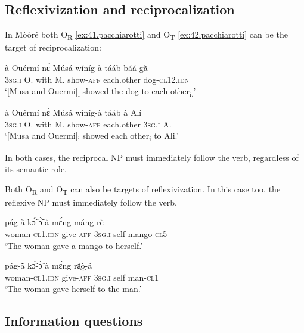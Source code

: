 \documentclass[output=paper]{langsci/langscibook}
\begin{document}
\subsection{Reflexivization and reciprocalization}\label{§5.4:reflexivization.pacchiarotti}

In Mòòré both O\textsubscript{R} \ref{ex:41.pacchiarotti} and O\textsubscript{T} \ref{ex:42.pacchiarotti} can be the target of reciprocalization:

\ea
\label{ex:41.pacchiarotti}
\gll \`{a}    Ouérm\'{i}  nɛ́  M\'{u}s\'{a}  w\'{i}n\'{i}g-\`{a}  t\'{a}\'{a}b    b\'{a}\'{a}-g\`{\~{a}} \\
\textsc{3sg.i  }  O.    with  M.  show-\textsc{aff}  each.other  dog-\textsc{cl12.idn}\\
\glt `[Musa and Ouermi]\textsubscript{i} showed the dog to each other\textsubscript{i.}'
\z

\ea
\label{ex:42.pacchiarotti}
\gll \`{a}    Ouérm\'{i}  nɛ́  M\'{u}s\'{a}  w\'{i}n\'{i}g-\`{a}  t\'{a}\'{a}b    \`{a}    Al\'{i}\\
\textsc{3sg.i    }O.    with  M.  show-\textsc{aff}  each.other  \textsc{3sg.i  }   A.\\
\glt `[Musa and Ouermi]\textsubscript{i} showed each other\textsubscript{i} to Ali.'
\z

In both cases, the reciprocal NP must immediately follow the verb, regardless of its semantic role. 

Both O\textsubscript{R }and O\textsubscript{T} can also be targets of reflexivization. In this case too, the reflexive NP must immediately follow the verb.

\ea
\label{ex:43.pacchiarotti}
\gll p\'{a}g-\`{\~{a}} kɔ̃́-ɔ̃̀ \`{a} mɛ́ng m\'{a}ng-r\`{e}\\
woman-\textsc{cl1.idn}  give-\textsc{aff}  \textsc{3sg.i  }  self  mango-\textsc{cl5}\\
\glt `The woman gave a mango to herself.'
\z

\ea
\label{ex:44.pacchiarotti}
\gll p\'{a}g-\`{\~{a}} kɔ̃́-ɔ̃̀ \`{a} mɛ́ng rà͜ò-\'{a} \\
woman-\textsc{cl1.idn}  give-\textsc{aff}  \textsc{3sg.i  }  self  man-\textsc{cl1}\\
\glt `The woman gave herself to the man.'
\z

\subsection{Information questions}\label{§5.5:Information.pacchiarotti}
\end{document}
